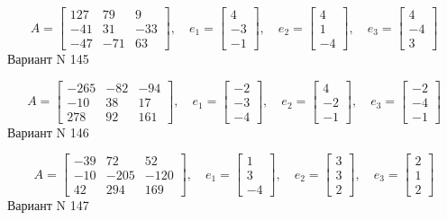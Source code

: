 \documentclass[11pt]{report}
\begin{document}
$$A = \left[\begin{matrix}127 & 79 & 9\\-41 & 31 & -33\\-47 & -71 & 63\end{matrix}\right],\quad e_1 = \left[\begin{matrix}4\\-3\\-1\end{matrix}\right],\quad e_2 = \left[\begin{matrix}4\\1\\-4\end{matrix}\right],\quad e_3 = \left[\begin{matrix}4\\-4\\3\end{matrix}\right]$$Вариант N 145

$$A = \left[\begin{matrix}-265 & -82 & -94\\-10 & 38 & 17\\278 & 92 & 161\end{matrix}\right],\quad e_1 = \left[\begin{matrix}-2\\-3\\-4\end{matrix}\right],\quad e_2 = \left[\begin{matrix}4\\-2\\-1\end{matrix}\right],\quad e_3 = \left[\begin{matrix}-2\\-4\\-1\end{matrix}\right]$$Вариант N 146

$$A = \left[\begin{matrix}-39 & 72 & 52\\-10 & -205 & -120\\42 & 294 & 169\end{matrix}\right],\quad e_1 = \left[\begin{matrix}1\\3\\-4\end{matrix}\right],\quad e_2 = \left[\begin{matrix}3\\3\\2\end{matrix}\right],\quad e_3 = \left[\begin{matrix}2\\1\\2\end{matrix}\right]$$Вариант N 147
\end{document}
